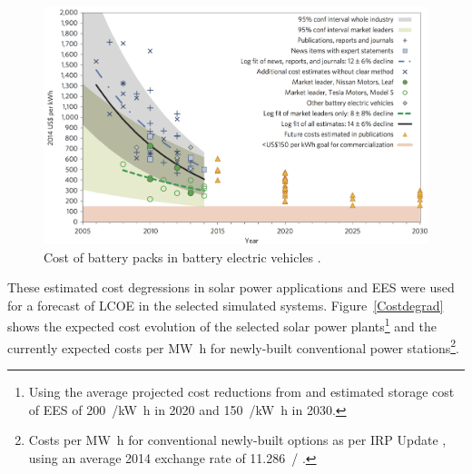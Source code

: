 \begin{figure}[htbp]  
\centering
\includegraphics[width=1\linewidth]{FIG/CostofLi-ion}
\caption[Cost of battery packs in battery electric vehicles.]{Cost of battery packs in battery electric vehicles \cite{Nykvist2015}.}\label{CostofLi-ion}
\end{figure}

These estimated cost degressions in solar power applications and \ac{EES} were used for a forecast of \ac{LCOE} in the selected simulated systems. Figure~\ref{Costdegrad} shows the expected cost evolution of the selected solar power plants\footnote{Using the average projected cost reductions from \cite{IEA2014c} and estimated storage cost of \ac{EES} of \SI{200}{\usd/\kilo\watt\hour} in 2020 and \SI{150}{\usd/\kilo\watt\hour} in 2030.} and the currently expected costs per \si{\mega\watt\hour} for newly-built conventional power stations\footnote{Costs per \si{\mega\watt\hour} for conventional newly-built options as per \ac{IRP} Update \cite{CSIR2015a}, using an average 2014 exchange rate of \SI{11.286}{\usd/\zar} \cite{IRS2015}.}.

